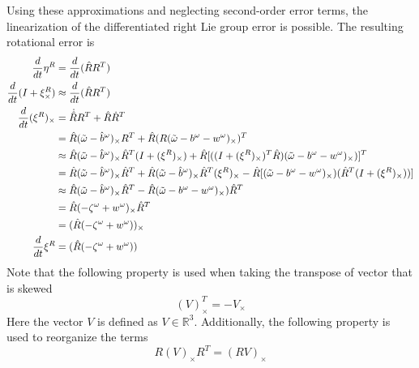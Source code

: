 Using these approximations and neglecting second-order error terms, the linearization of the differentiated right Lie group error is possible. The resulting rotational error is
\begin{equation}
    \begin{split}
        \frac{d}{dt} \eta^R &= \frac{d}{dt} (\hat{R} R^T) \\
        \frac{d}{dt} (I + \xi^R_{\times}) &\approx \frac{d}{dt} (\hat{R} R^T) \\
        \frac{d}{dt} (\xi^R)_{\times} &= \dot{\hat{R}} R^T + \hat{R} \dot{R}^T \\
        &= \hat{R} (\Tilde{\omega} - \hat{b}^{\omega})_{\times} R^T + \hat{R} (R (\Tilde{\omega} -b^{\omega} - w^{\omega})_{\times})^T \\
        &\approx  \hat{R} (\Tilde{\omega} - \hat{b}^{\omega})_{\times} \hat{R}^T (I + (\xi^R)_{\times}) + \hat{R} [((I + (\xi^R)_{\times})^T \hat{R} ) (\Tilde{\omega} -b^{\omega} - w^{\omega})_{\times})]^T \\
        &= \hat{R} (\Tilde{\omega} - \hat{b}^{\omega})_{\times} \hat{R}^T +
            \hat{R} (\Tilde{\omega} - \hat{b}^{\omega})_{\times} \hat{R}^T (\xi^R)_{\times} - 
            \hat{R} [ (\Tilde{\omega} -b^{\omega} - w^{\omega})_{\times}) (\hat{R}^T (I + (\xi^R)_{\times}))]\\
        &\approx \hat{R} (\Tilde{\omega} - \hat{b}^{\omega})_{\times} \hat{R}^T - 
           \hat{R} (\Tilde{\omega} -b^{\omega} - w^{\omega})_{\times}) \hat{R}^T \\
       &= \hat{R} (-\zeta^{\omega} + w^{\omega})_{\times} \hat{R}^T \\
       &= (\hat{R} (-\zeta^{\omega} + w^{\omega}))_{\times} \\
       \frac{d}{dt} \xi^R &=  (\hat{R} (-\zeta^{\omega} + w^{\omega}))
        \label{eq: R linearized RInEKF}
    \end{split}
\end{equation}
Note that the following property is  used when taking the transpose of vector that is skewed
\begin{equation}
    (V)_{\times}^T = -V_{\times}
    \label{eq: transpose of skew}
\end{equation}
Here the vector $V$ is defined as $V \in \mathbb{R}^3$. Additionally, the following property is used to reorganize the terms
\begin{equation}
    R (V)_{\times} R^T = (R V)_{\times}
    \label{eq: RvR^T property}
\end{equation}
